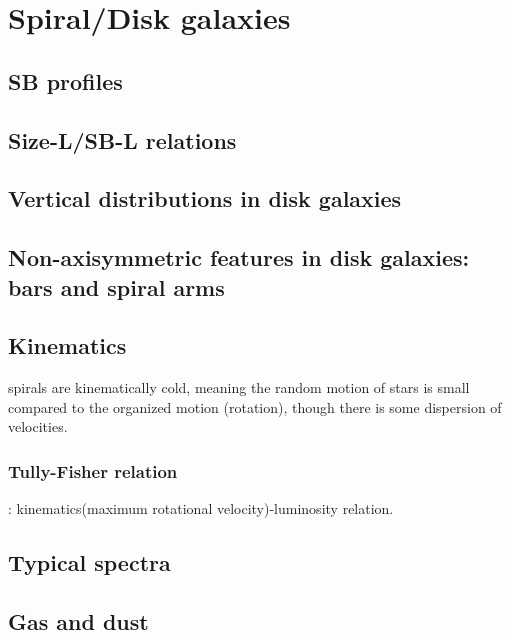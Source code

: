 \documentclass{article}
\begin{document}
\section{Spiral/Disk galaxies}
\subsection{SB profiles}
\subsection{Size-L/SB-L relations}
\subsection{Vertical distributions in disk galaxies}
\subsection{Non-axisymmetric features in disk galaxies: bars and spiral arms}
\subsection{Kinematics}
spirals are kinematically cold, meaning the
random motion of stars is small compared to the organized motion
(rotation), though there is some dispersion of velocities.

\subsubsection{Tully-Fisher relation}:
kinematics(maximum rotational velocity)-luminosity relation.
\subsection{Typical spectra}
\subsection{Gas and dust}
\end{document}
